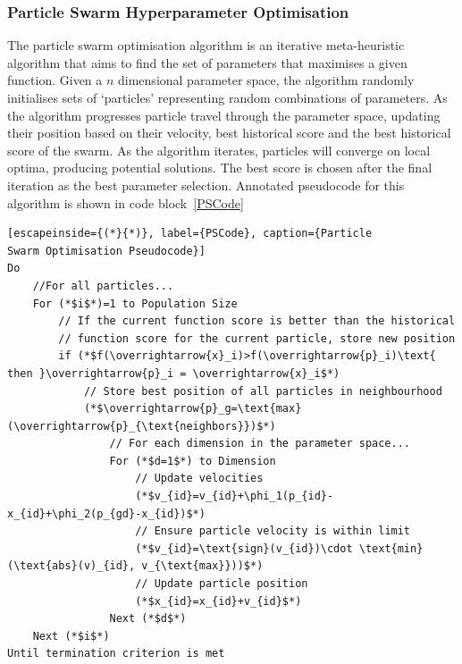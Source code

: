 \documentclass[titlepage, 12pt]{scrartcl} \usepackage{enumitem}
\begin{document}
\subsubsection{Particle Swarm Hyperparameter Optimisation}\label{PSOp}
The particle swarm optimisation algorithm is an iterative meta-heuristic algorithm that
aims to find the set of parameters that maximises a given function. Given a
$n$ dimensional parameter space, the algorithm randomly initialises sets of
`particles' representing random combinations of parameters. As the algorithm
progresses particle travel through the parameter space, updating their
position based on their velocity, best historical score and the best historical
score of the swarm. As the algorithm iterates, particles will converge on local
optima, producing potential solutions. The best score is chosen after the final
iteration as the best parameter selection. Annotated pseudocode for this
algorithm is shown in code block~\ref{PSCode}~\parencite{Clerc2002}

\onehalfspacing
\begin{lstlisting}[escapeinside={(*}{*)}, label={PSCode}, caption={Particle
Swarm Optimisation Pseudocode}]
Do
    //For all particles...
    For (*$i$*)=1 to Population Size
        // If the current function score is better than the historical
        // function score for the current particle, store new position
        if (*$f(\overrightarrow{x}_i)>f(\overrightarrow{p}_i)\text{ then }\overrightarrow{p}_i = \overrightarrow{x}_i$*)
            // Store best position of all particles in neighbourhood
            (*$\overrightarrow{p}_g=\text{max}(\overrightarrow{p}_{\text{neighbors}})$*)
                // For each dimension in the parameter space...
                For (*$d=1$*) to Dimension
                    // Update velocities
                    (*$v_{id}=v_{id}+\phi_1(p_{id}-x_{id}+\phi_2(p_{gd}-x_{id})$*)
                    // Ensure particle velocity is within limit
                    (*$v_{id}=\text{sign}(v_{id})\cdot \text{min}(\text{abs}(v)_{id}, v_{\text{max}}))$*)
                    // Update particle position
                    (*$x_{id}=x_{id}+v_{id}$*)
                Next (*$d$*)
    Next (*$i$*)
Until termination criterion is met
\end{lstlisting}
\doublespacing
\end{document}
